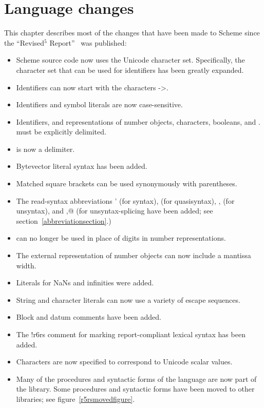\chapter{Language changes}
\label{languagechangesappendix}

This chapter describes most of the changes that have been made to
Scheme since the ``Revised$^5$ Report''~\cite{R5RS} was published:

\begin{itemize}
\item Scheme source code now uses the Unicode character set.
  Specifically, the character set that can be used for identifiers has
  been greatly expanded.
\item Identifiers can now start with the characters {\cf ->}.
\item Identifiers and symbol literals are now case-sensitive.
\item Identifiers, and representations of number objects, characters, booleans, and
  {\cf .} must be explicitly delimited.
\item {\cf \sharpsign} is now a delimiter.
\item Bytevector literal syntax has been added.
\item Matched square brackets can be used synonymously with parentheses.
\item The read-syntax abbreviations {\cf \sharpsign{}'} (for {\cf
    syntax}), {\cf \sharpsign\backquote} (for {\cf quasisyntax}), {\cf
    \sharpsign{},} (for {\cf unsyntax}), and {\cf \sharpsign{},@}
  (for {\cf unsyntax-splicing} have been added; see section~\ref{abbreviationsection}.)
\item {\cf \sharpsign} can no longer be used in place of digits in number
  representations.
\item The external representation of number objects can now include a
  mantissa width.
\item Literals for NaNs and infinities were added.
\item String and character literals can now use a variety of escape
  sequences.
\item Block and datum comments have been added.
\item The {\cf !\sharpsign{}r6rs} comment for marking report-compliant
  lexical syntax has been added.
\item Characters are now specified to correspond to Unicode scalar
  values.
\item Many of the procedures and syntactic forms of the language are
  now part of the  library.  Some procedures and
  syntactic forms have been moved to other libraries; see figure~\ref{r5rsmovedfigure}.


\end{itemize}
